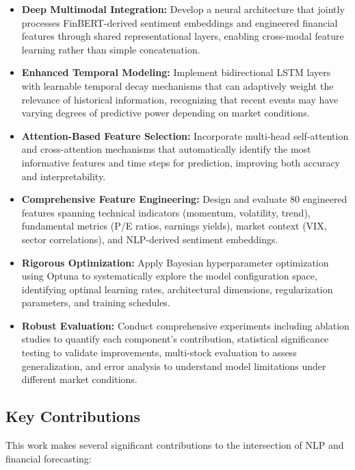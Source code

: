 \documentclass[conference]{IEEEtran}
\begin{document}
\begin{itemize}
\item \textbf{Deep Multimodal Integration:} Develop a neural architecture that jointly processes FinBERT-derived sentiment embeddings and engineered financial features through shared representational layers, enabling cross-modal feature learning rather than simple concatenation.

\item \textbf{Enhanced Temporal Modeling:} Implement bidirectional LSTM layers with learnable temporal decay mechanisms that can adaptively weight the relevance of historical information, recognizing that recent events may have varying degrees of predictive power depending on market conditions.

\item \textbf{Attention-Based Feature Selection:} Incorporate multi-head self-attention and cross-attention mechanisms that automatically identify the most informative features and time steps for prediction, improving both accuracy and interpretability.

\item \textbf{Comprehensive Feature Engineering:} Design and evaluate 80 engineered features spanning technical indicators (momentum, volatility, trend), fundamental metrics (P/E ratios, earnings yields), market context (VIX, sector correlations), and NLP-derived sentiment embeddings.

\item \textbf{Rigorous Optimization:} Apply Bayesian hyperparameter optimization using Optuna to systematically explore the model configuration space, identifying optimal learning rates, architectural dimensions, regularization parameters, and training schedules.

\item \textbf{Robust Evaluation:} Conduct comprehensive experiments including ablation studies to quantify each component's contribution, statistical significance testing to validate improvements, multi-stock evaluation to assess generalization, and error analysis to understand model limitations under different market conditions.
\end{itemize}

\subsection{Key Contributions}

This work makes several significant contributions to the intersection of NLP and financial forecasting:
\end{document}
